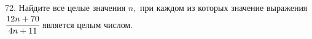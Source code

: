 72. Найдите все целые значения $n,$ при каждом из которых значение выражения $\cfrac{12n+70}{4n+11}$ является целым числом.\\
